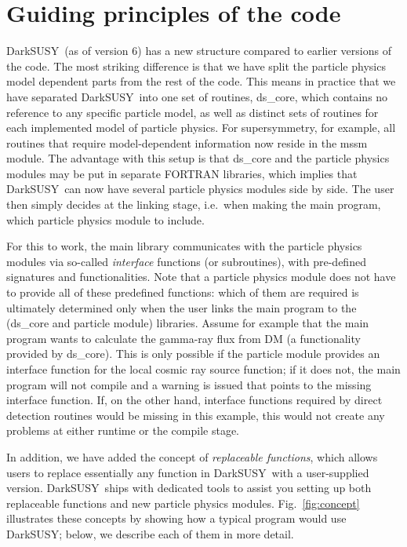 \documentclass[a4paper,10pt,oneside]{book}
\newcommand{\code}[1]{\ft{#1}}
\newcommand{\ds}{{\sffamily DarkSUSY}}
\newcommand{\ft}[1]{\textsf{#1}}
\begin{document}
\chapter{Guiding principles of the code}
\label{ch:philosophy}

\ds\ (as of version 6) has a new structure compared to earlier versions of the code. The most 
striking difference is that we have split the particle physics model dependent parts from 
the rest of the code. This means in practice that we have separated \ds\ into one set of 
routines, \code{ds\_core}, which contains no reference to any specific particle model, as 
well as distinct sets of routines for each implemented model of particle physics. For 
supersymmetry, 
 for example, all routines that require model-dependent information now reside in the 
 \code{mssm} module. The advantage with this setup is that \code{ds\_core} and the 
 particle physics modules may be put in separate FORTRAN libraries, which implies
 that \ds\ can now have several particle physics modules side by side. The user 
 then simply decides at the linking stage, i.e.~when making the main program, which 
 particle physics module to include. 
 
 For this to work, the main library communicates with the particle physics modules via
 so-called \emph{interface} functions (or subroutines), with 
 pre-defined signatures and functionalities.  Note that a 
 particle physics module does not have to provide all of these predefined functions: 
 which of them are required is ultimately determined only when the user links the main
 program to the (\code{ds\_core} and particle module) libraries. Assume for example that 
 the main program wants to calculate 
 the gamma-ray flux from DM (a functionality provided by \code{ds\_core}). This is only
 possible if the particle module provides an interface function for the local cosmic ray
 source function; if it does not, the main program will not compile and a  
 warning is issued that points to the missing interface function. If, on the other hand,
 interface functions required by direct detection routines would be missing in this example,
 this would not create any problems at either runtime or the compile stage.


 In addition, we have added the concept of 
 \emph{replaceable functions}, which allows users to replace essentially any function in 
 \ds\ with a user-supplied version. \ds\ ships with dedicated tools to assist you setting up 
 both replaceable functions and new particle physics modules.
 Fig.~\ref{fig:concept} illustrates these concepts by showing how a typical program 
 would use \ds; below, we describe each of them in more detail. 
\end{document}
